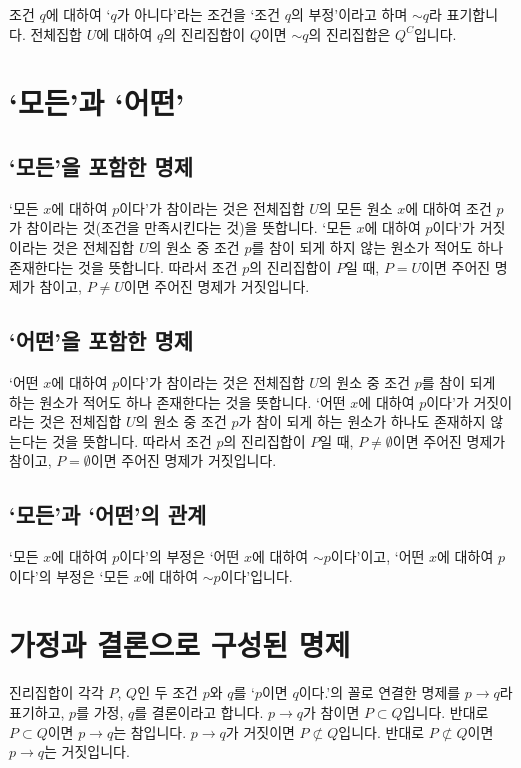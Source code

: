 조건 $q$에 대하여 `$q$가 아니다'라는 조건을 `조건 $q$의 부정'이라고 하며 $\sim q$라 표기합니다. 전체집합 $U$에 대하여 $q$의 진리집합이 $Q$이면 $\sim q$의 진리집합은 $Q^C$입니다.

\section{`모든'과 `어떤'}

\subsection{`모든'을 포함한 명제}
`모든 $x$에 대하여 $p$이다'가 참이라는 것은 전체집합 $U$의 모든 원소 $x$에 대하여 조건 $p$가 참이라는 것(조건을 만족시킨다는 것)을 뜻합니다. `모든 $x$에 대하여 $p$이다'가 거짓이라는 것은 전체집합 $U$의 원소 중 조건 $p$를 참이 되게 하지 않는 원소가 적어도 하나 존재한다는 것을 뜻합니다. 따라서 조건 $p$의 진리집합이 $P$일 때, $P=U$이면 주어진 명제가 참이고, $P \ne U$이면 주어진 명제가 거짓입니다.

\subsection{`어떤'을 포함한 명제}
`어떤 $x$에 대하여 $p$이다'가 참이라는 것은 전체집합 $U$의 원소 중 조건 $p$를 참이 되게 하는 원소가 적어도 하나 존재한다는 것을 뜻합니다. `어떤 $x$에 대하여 $p$이다'가 거짓이라는 것은 전체집합 $U$의 원소 중 조건 $p$가 참이 되게 하는 원소가 하나도 존재하지 않는다는 것을 뜻합니다. 따라서 조건 $p$의 진리집합이 $P$일 때, $P \ne \emptyset$이면 주어진 명제가 참이고, $P =\emptyset$이면 주어진 명제가 거짓입니다.
\cleartorecto
\subsection{`모든'과 `어떤'의 관계}
`모든 $x$에 대하여 $p$이다'의 부정은 `어떤 $x$에 대하여 $\sim p$이다'이고, `어떤 $x$에 대하여 $p$이다'의 부정은 `모든 $x$에 대하여 $\sim p$이다'입니다.


\section{가정과 결론으로 구성된 명제}
진리집합이 각각 $P$, $Q$인 두 조건 $p$와 $q$를 `$p$이면 $q$이다.'의 꼴로 연결한 명제를 $p \longrightarrow q$라 표기하고, $p$를 가정, $q$를 결론이라고 합니다. $p \longrightarrow q$가 참이면 $P \subset Q$입니다. 반대로 $P \subset Q$이면 $p \longrightarrow q$는 참입니다.  $p \longrightarrow q$가 거짓이면 $P \not\subset Q$입니다. 반대로 $P \not\subset Q$이면 $p \longrightarrow q$는 거짓입니다.

